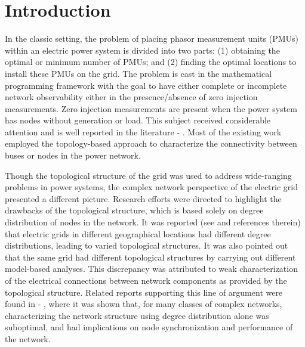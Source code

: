 \documentclass[10pt,journal,twocolumn]{IEEEtran}\IEEEoverridecommandlockouts
\begin{document}
\section{Introduction}\label{sec:introduction}
In the classic setting, the problem of placing phasor measurement units (PMUs) within an electric power system is divided into two parts: (1) obtaining the optimal or minimum number of PMUs; and (2) finding the optimal locations to install these PMUs on the grid. The problem is cast in the mathematical programming framework with the goal to have either complete or incomplete network observability either in the presence/absence of  zero injection measurements. Zero injection measurements are present when the power system has nodes without generation or load. This subject received considerable attention and is well reported in the literature \cite{Nuqui2005} - \nocite{Gou2008}\nocite{Gou2008a}\nocite{Baldwin1993}\nocite{Milosevic2003}\nocite{Zhang2010}\nocite{Xu2004}\nocite{Azizi2012}
\nocite{Kekatos2012}\nocite{Li2013}\nocite{Fesharaki2013}\cite{Anderson2014}. Most of the existing work employed the topology-based approach to characterize the connectivity between buses or nodes in the power network.

Though the topological structure of the grid was used to address wide-ranging problems in power systems, the complex network \cite{Boccaletti2006} perspective of the electric grid presented a different picture. Research efforts were directed to highlight the drawbacks of the topological structure, which is based solely on degree distribution of nodes in the network. It was reported (see \cite[Section I]{Cotilla-Sanchez2012} and references therein) that electric grids in different geographical locations had different degree distributions, leading to varied topological structures. It was also pointed out that the same grid had different topological structures by carrying out different model-based analyses. This discrepancy was attributed to weak characterization of the electrical connections between network components as provided by the topological structure. Related reports supporting this line of argument were found in \cite{Wu1995} - \nocite{Wu2005}\nocite{Atay2006}\cite{Dorfler2010}, where it was shown that, for many classes of complex networks, characterizing the network structure using degree distribution alone was suboptimal, and had implications on node synchronization and performance of the network.
\end{document}
